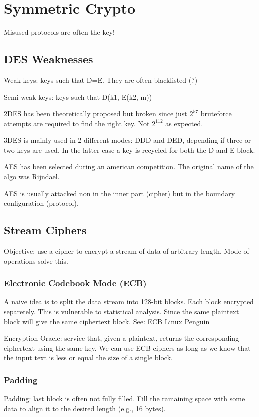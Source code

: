 \chapter{Symmetric Crypto}

Misused protocols are often the key!

\section{DES Weaknesses}
Weak keys: keys such that D=E. They are often blacklisted (?)

Semi-weak keys: keys such that D(k1, E(k2, m))

2DES has been theoretically proposed but broken since just $2^{57}$ bruteforce attempts are required to find the right key.
Not $2^{112}$ as expected.

3DES is mainly used in 2 different modes: DDD and DED, depending if three or two keys are used.
In the latter case a key is recycled for both the D and E block.

AES has been selected during an american competition. The original name of the algo was Rijndael.

AES is usually attacked non in the inner part (cipher) but in the boundary configuration (protocol).

\section{Stream Ciphers}
Objective: use a cipher to encrypt a stream of data of arbitrary length. Mode of operations solve this.

\subsection{Electronic Codebook Mode (ECB)}
A naive idea is to split the data stream into 128-bit blocks. Each block encrypted separetely.
This is vulnerable to statistical analysis. Since the same plaintext block will give the same ciphertext block.
See: ECB Linux Penguin

Encryption Oracle: service that, given a plaintext, returns the corresponding ciphertext using the same key.
We can use ECB ciphers as long as we know that the input text is less or equal the size of a single block.

\subsection{Padding}
Padding: last block is often not fully filled. Fill the ramaining space with some data to align it to the desired length (e.g., 16 bytes).

